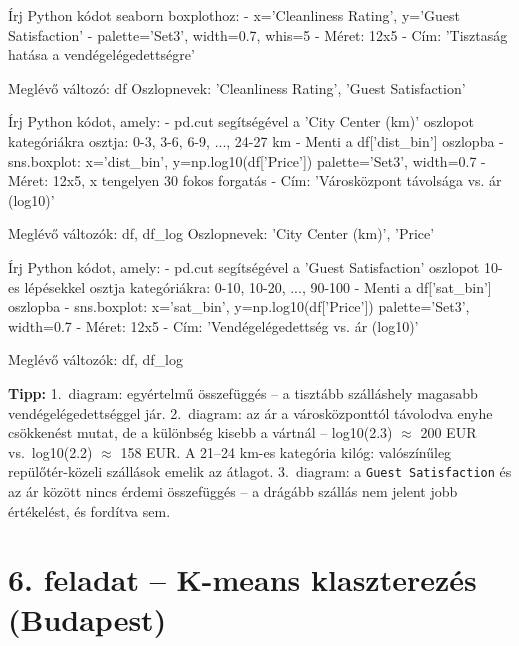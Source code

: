 \documentclass[11pt,a4paper]{article}
\newcommand{\tip}[1]{%
  \vspace{3pt}%
  \begin{tcolorbox}[tipstyle]%
  \textbf{\textcolor{tipborder}{Tipp:}} #1%
  \end{tcolorbox}\vspace{2pt}}
\newcommand{\lbl}[1]{\vspace{6pt}\noindent{\small\bfseries\textcolor{labelcolor}{#1}}\par\smallskip}
\begin{document}
\lbl{1.\ diagram -- Tisztaság és vendégelégedettség}

\begin{prompt}
Írj Python kódot seaborn boxplothoz:
- x='Cleanliness Rating', y='Guest Satisfaction'
- palette='Set3', width=0.7, whis=5
- Méret: 12x5
- Cím: 'Tisztaság hatása a vendégelégedettségre'

Meglévő változó: df
Oszlopnevek: 'Cleanliness Rating', 'Guest Satisfaction'
\end{prompt}

\lbl{2.\ diagram -- Városközponttól való távolság és ár}

\begin{prompt}
Írj Python kódot, amely:
- pd.cut segítségével a 'City Center (km)' oszlopot
  kategóriákra osztja: 0-3, 3-6, 6-9, ..., 24-27 km
- Menti a df['dist_bin'] oszlopba
- sns.boxplot: x='dist_bin', y=np.log10(df['Price'])
  palette='Set3', width=0.7
- Méret: 12x5, x tengelyen 30 fokos forgatás
- Cím: 'Városközpont távolsága vs. ár (log10)'

Meglévő változók: df, df_log
Oszlopnevek: 'City Center (km)', 'Price'
\end{prompt}

\lbl{3.\ diagram -- Vendégelégedettség és ár}

\begin{prompt}
Írj Python kódot, amely:
- pd.cut segítségével a 'Guest Satisfaction' oszlopot
  10-es lépésekkel osztja kategóriákra: 0-10, 10-20, ..., 90-100
- Menti a df['sat_bin'] oszlopba
- sns.boxplot: x='sat_bin', y=np.log10(df['Price'])
  palette='Set3', width=0.7
- Méret: 12x5
- Cím: 'Vendégelégedettség vs. ár (log10)'

Meglévő változók: df, df_log
\end{prompt}

\tip{1.\ diagram: egyértelmű összefüggés -- a tisztább szálláshely magasabb vendégelégedettséggel jár.
2.\ diagram: az ár a városközponttól távolodva enyhe csökkenést mutat, de a különbség kisebb a vártnál --
log10(2.3) $\approx$ 200 EUR vs.\ log10(2.2) $\approx$ 158 EUR.
A 21--24 km-es kategória kilóg: valószínűleg repülőtér-közeli szállások emelik az átlagot.
3.\ diagram: a \texttt{Guest Satisfaction} és az ár között nincs érdemi összefüggés --
a drágább szállás nem jelent jobb értékelést, és fordítva sem.}

\section{6. feladat -- K-means klaszterezés (Budapest)}
\end{document}
